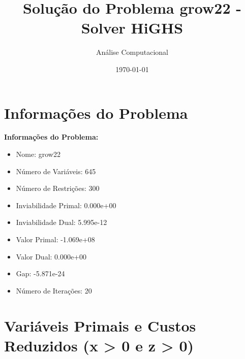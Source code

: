 \documentclass[12pt]{article}
\title{Solução do Problema grow22 - Solver HiGHS}
\author{Análise Computacional}
\date{\today}
\begin{document}
\maketitle

\section{Informações do Problema}

\textbf{Informações do Problema:}
\begin{itemize}
\item Nome: grow22
\item Número de Variáveis: 645
\item Número de Restrições: 300
\item Inviabilidade Primal: 0.000e+00
\item Inviabilidade Dual: 5.995e-12
\item Valor Primal: -1.069e+08
\item Valor Dual: 0.000e+00
\item Gap: -5.871e-24
\item Número de Iterações: 20
\end{itemize}


\section{Variáveis Primais e Custos Reduzidos (x > 0 e z > 0)}
\end{document}
